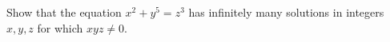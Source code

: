 Show that the equation $x^2+y^5=z^3$ has infinitely many solutions in integers $x, y,z$ for which $xyz \neq 0$.